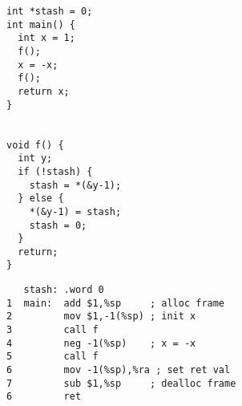 \documentclass[acmsmall,review,anonymous]{acmart}\settopmatter{printfolios=true,printccs=false,printacmref=false}
\begin{document}
\begin{figure}
  \centering
\hspace*{-6em}
  \begin{subfigure}[t]{.2\textwidth}
{\footnotesize
\begin{verbatim}
int *stash = 0;
int main() {
  int x = 1;
  f();
  x = -x;
  f();
  return x;
}


void f() {
  int y;
  if (!stash) {
    stash = *(&y-1);
  } else {
    *(&y-1) = stash;
    stash = 0;
  }
  return;
}
\end{verbatim}
}
\end{subfigure}
  \begin{subfigure}[t]{.4\textwidth}
{\footnotesize
\begin{verbatim}
   stash: .word 0
1  main:  add $1,%sp     ; alloc frame
2         mov $1,-1(%sp) ; init x
3         call f
4         neg -1(%sp)    ; x = -x
5         call f
6         mov -1(%sp),%ra ; set ret val
7         sub $1,%sp     ; dealloc frame
6         ret


\end{verbatim}}
\end{subfigure}
\end{figure}
\end{document}
